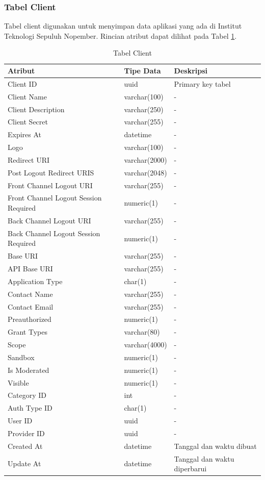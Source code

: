 \subsubsection{Tabel Client}
\par Tabel client digunakan untuk menyimpan data aplikasi yang ada di Institut Teknologi Sepuluh Nopember. Rincian atribut dapat dilihat pada Tabel \ref{tabel_client}.
\begin{longtable}{|p{2cm}|p{2.5cm}|p{4.5cm}|}
	\caption{Tabel Client} \label{tabel_client} \\ \hline
    {Atribut} & {Tipe Data} & {Deskripsi} \\ \hline
    Client ID & uuid & Primary key tabel \\ \hline
    Client Name & varchar(100) & - \\ \hline
    Client Description & varchar(250) & - \\ \hline
    Client Secret & varchar(255) & - \\ \hline
    Expires At & datetime & - \\ \hline
    Logo & varchar(100) & - \\ \hline
    Redirect URI & varchar(2000) & - \\ \hline
    Post Logout Redirect URIS & varchar(2048) & - \\ \hline
    Front Channel Logout URI & varchar(255) & - \\ \hline
    Front Channel Logout Session Required & numeric(1) & - \\ \hline
    Back Channel Logout URI & varchar(255) & - \\ \hline
    Back Channel Logout Session Required & numeric(1) & - \\ \hline
    Base URI & varchar(255) & - \\ \hline
    API Base URI & varchar(255) & - \\ \hline
    Application Type & char(1) & - \\ \hline
    Contact Name & varchar(255) & - \\ \hline
    Contact Email & varchar(255) & - \\ \hline
    Preauthorized & numeric(1) & - \\ \hline
    Grant Types & varchar(80) & - \\ \hline
    Scope & varchar(4000) & - \\ \hline
    Sandbox & numeric(1) & - \\ \hline
    Is Moderated & numeric(1) & - \\ \hline
    Visible & numeric(1) & - \\ \hline
    Category ID & int & - \\ \hline
    Auth Type ID & char(1) & - \\ \hline
    User ID & uuid & - \\ \hline
    Provider ID & uuid & - \\ \hline
    Created At & datetime & Tanggal dan waktu dibuat \\ \hline
    Update At & datetime & Tanggal dan waktu diperbarui \\ \hline
\end{longtable}

